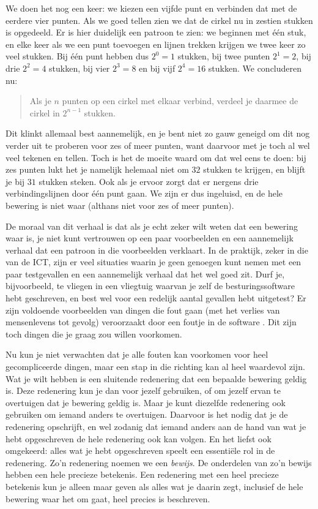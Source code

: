 We doen het nog een keer: we kiezen een vijfde punt en verbinden dat met de eerdere vier punten. Als we goed tellen zien we dat de cirkel nu in zestien stukken is opgedeeld. Er is hier duidelijk een patroon te zien: we beginnen met \'e\'en stuk, en elke keer als we een punt toevoegen en lijnen trekken krijgen we twee keer zo veel stukken. Bij \'e\'en punt hebben dus $2^0=1$ stukken, bij twee punten $2^1=2$, bij drie $2^2=4$ stukken, bij vier $2^3=8$ en bij vijf $2^4=16$ stukken. We concluderen nu:
\begin{quote}Als je $n$ punten op een cirkel met elkaar verbind, verdeel je daarmee de cirkel in $2^{n-1}$ stukken.\end{quote}

Dit klinkt allemaal best aannemelijk, en je bent niet zo gauw geneigd om dit nog verder uit te proberen voor zes of meer punten, want daarvoor met je toch al wel veel tekenen en tellen. Toch is het de moeite waard om dat wel eens te doen: bij zes punten lukt het je namelijk helemaal niet om $32$ stukken te krijgen, en blijft je bij $31$ stukken steken. Ook als je ervoor zorgt dat er nergens drie verbindingslijnen door \'e\'en punt gaan. We zijn er dus ingeluisd, en de hele bewering is niet waar (althans niet voor zes of meer punten).

De moraal van dit verhaal is dat als je echt zeker wilt weten dat een bewering waar is, je niet kunt vertrouwen op een paar voorbeelden en een aannemelijk verhaal dat een patroon in die voorbeelden verklaart. In de praktijk, zeker in die van de ICT, zijn er veel situaties waarin je geen genoegen kunt nemen met een paar testgevallen en een aannemelijk verhaal dat het wel goed zit. Durf je, bijvoorbeeld, te vliegen in een vliegtuig waarvan je zelf de besturingssoftware hebt geschreven, en best wel voor een redelijk aantal gevallen hebt uitgetest? Er zijn voldoende voorbeelden van dingen die fout gaan (met het verlies van mensenlevens tot gevolg) veroorzaakt door een foutje in de software \citep{fatalBugs}. Dit zijn toch dingen die je graag zou willen voorkomen.

Nu kun je niet verwachten dat je alle fouten kan voorkomen voor heel gecompliceerde dingen, maar een stap in die richting kan al heel waardevol zijn.  Wat je wilt hebben is een sluitende redenering dat een bepaalde bewering geldig is. Deze redenering kun je dan voor jezelf gebruiken, of om jezelf ervan te overtuigen dat je bewering geldig is. Maar je kunt diezelfde redenering ook gebruiken om iemand anders te overtuigen. Daarvoor is het nodig dat je de redenering opschrijft, en wel zodanig dat iemand anders aan de hand van wat je hebt opgeschreven de hele redenering ook kan volgen. En het liefst ook omgekeerd: alles wat je hebt opgeschreven speelt een essenti\"ele rol in de redenering. Zo'n redenering noemen we een \textit{bewijs}. De onderdelen van zo'n bewijs hebben een hele precieze betekenis. Een redenering met een heel precieze betekenis kun je alleen maar geven als alles wat je daarin zegt, inclusief de hele bewering waar het om gaat, heel precies is beschreven.

